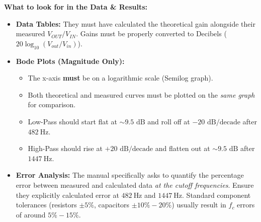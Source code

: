 \documentclass[11pt]{article}
\begin{document}
\textbf{What to look for in the Data \& Results:}
\begin{itemize}
  \item \textbf{Data Tables:} They must have calculated the theoretical gain alongside their measured $V_{OUT}/V_{IN}$. Gains must be properly converted to Decibels ($20 \log_{10}(V_{out}/V_{in})$).

  \item \textbf{Bode Plots (Magnitude Only):}
    \begin{itemize}
      \item The x-axis \textbf{must} be on a logarithmic scale (Semilog graph).
      \item Both theoretical and measured curves must be plotted on the \textit{same graph} for comparison.
      \item Low-Pass should start flat at $\sim 9.5 \text{ dB}$ and roll off at $-20 \text{ dB/decade}$ after $\SI{482}{\hertz}$.
      \item High-Pass should rise at $+20 \text{ dB/decade}$ and flatten out at $\sim 9.5 \text{ dB}$ after $\SI{1447}{\hertz}$.
    \end{itemize}

  \item \textbf{Error Analysis:} The manual specifically asks to quantify the percentage error between measured and calculated data \textit{at the cutoff frequencies}. Ensure they explicitly calculated error at $\SI{482}{\hertz}$ and $\SI{1447}{\hertz}$. Standard component tolerances (resistors $\pm 5\%$, capacitors $\pm 10\% - 20\%$) usually result in $f_c$ errors of around $5\% - 15\%$.
\end{itemize}
\end{document}
